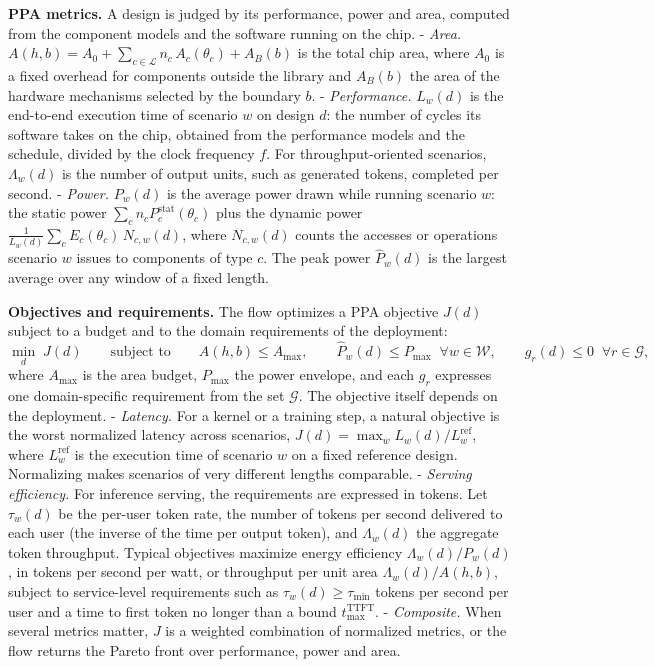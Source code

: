 \documentclass[11pt]{article}
\begin{document}
\textbf{PPA metrics.} A design is judged by its performance, power and area, computed from the component models and the software running on the chip.
- \emph{Area.} \(A(h,b)=A_0+\sum_{c\in\mathcal L}n_c\,A_c(\theta_c)+A_B(b)\) is the total chip area, where \(A_0\) is a fixed overhead for components outside the library and \(A_B(b)\) the area of the hardware mechanisms selected by the boundary \(b\).
- \emph{Performance.} \(L_w(d)\) is the end-to-end execution time of scenario \(w\) on design \(d\): the number of cycles its software takes on the chip, obtained from the performance models and the schedule, divided by the clock frequency \(f\). For throughput-oriented scenarios, \(\Lambda_w(d)\) is the number of output units, such as generated tokens, completed per second.
- \emph{Power.} \(P_w(d)\) is the average power drawn while running scenario \(w\): the static power \(\sum_c n_c P^{\mathrm{stat}}_c(\theta_c)\) plus the dynamic power \(\frac{1}{L_w(d)}\sum_c E_c(\theta_c)\,N_{c,w}(d)\), where \(N_{c,w}(d)\) counts the accesses or operations scenario \(w\) issues to components of type \(c\). The peak power \(\hat P_w(d)\) is the largest average over any window of a fixed length.

\textbf{Objectives and requirements.} The flow optimizes a PPA objective \(J(d)\) subject to a budget and to the domain requirements of the deployment:
\[
\min_{d}\;J(d)\qquad\text{subject to}\qquad A(h,b)\le A_{\max},\qquad \hat P_w(d)\le P_{\max}\;\;\forall w\in\mathcal W,\qquad g_r(d)\le0\;\;\forall r\in\mathcal G,
\]
where \(A_{\max}\) is the area budget, \(P_{\max}\) the power envelope, and each \(g_r\) expresses one domain-specific requirement from the set \(\mathcal G\). The objective itself depends on the deployment.
- \emph{Latency.} For a kernel or a training step, a natural objective is the worst normalized latency across scenarios, \(J(d)=\max_{w}L_w(d)/L_w^{\mathrm{ref}}\), where \(L_w^{\mathrm{ref}}\) is the execution time of scenario \(w\) on a fixed reference design. Normalizing makes scenarios of very different lengths comparable.
- \emph{Serving efficiency.} For inference serving, the requirements are expressed in tokens. Let \(\tau_w(d)\) be the per-user token rate, the number of tokens per second delivered to each user (the inverse of the time per output token), and \(\Lambda_w(d)\) the aggregate token throughput. Typical objectives maximize energy efficiency \(\Lambda_w(d)/P_w(d)\), in tokens per second per watt, or throughput per unit area \(\Lambda_w(d)/A(h,b)\), subject to service-level requirements such as \(\tau_w(d)\ge\tau_{\min}\) tokens per second per user and a time to first token no longer than a bound \(t^{\mathrm{TTFT}}_{\max}\).
- \emph{Composite.} When several metrics matter, \(J\) is a weighted combination of normalized metrics, or the flow returns the Pareto front over performance, power and area.
\end{document}
